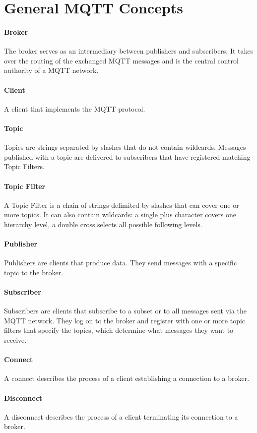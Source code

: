 \section{General MQTT Concepts}
\paragraph{Broker}
The broker serves as an intermediary between publishers and subscribers.
It takes over the routing of the exchanged MQTT messages and is the central control authority of a MQTT network.
\paragraph{Client}
A client that implements the MQTT protocol. 
\paragraph{Topic}
Topics are strings separated by slashes that do not contain wildcards.
Messages published with a topic are delivered to subscribers that have registered matching Topic Filters.
\paragraph{Topic Filter}
A Topic Filter is a chain of strings delimited by slashes that 
can cover one or more topics. 
It can also contain wildcards: a single plus character covers one hierarchy level, a double cross selects all possible following levels.
\paragraph{Publisher}
Publishers are clients that produce data.
They send messages with a specific topic to the broker.
\paragraph{Subscriber}
Subscribers are clients that subscribe to a subset or to all messages sent via the
MQTT network.
They log on to the broker and register with one or more topic filters that specify the topics, which determine what messages they want to receive.
\paragraph{Connect}
A connect describes the process of a client establishing a connection to a broker.
\paragraph{Disconnect}
A disconnect describes the process of a client terminating its connection to a broker.


